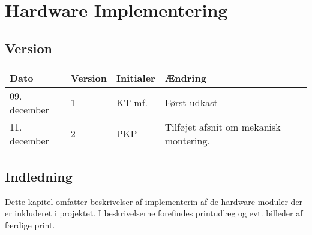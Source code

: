 \chapter{Hardware Implementering}\label{ch:hwimpl}
\section*{Version}
\begin{table}[h]
	\centering
	\begin{tabularx}{\textwidth - 2cm}{|l|l|l|X|}
	\hline
	Dato			& Version			& Initialer 		& Ændring										\\ \hline
	09. december	& 1 				& KT mf.	 		& Først udkast			\\ \hline
	11. december	& 2 				& PKP		 		& Tilføjet afsnit om mekanisk montering.	\\\hline
	\end{tabularx}
\end{table}

\section*{Indledning}

Dette kapitel omfatter beskrivelser af implementerin af de hardware moduler der er inkluderet i projektet.
I beskrivelserne forefindes printudlæg og evt. billeder af færdige print.

\clearpage


\clearpage

\clearpage

\clearpage

\clearpage

\clearpage